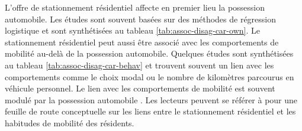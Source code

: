         L'offre de stationnement résidentiel affecte en premier lieu la possession automobile. Les études sont souvent basées sur des méthodes de régression logistique et sont synthétisées au tableau \ref{tab:assoc-disag-car-own}. Le stationnement résidentiel peut aussi être associé avec les comportements de mobilité au-delà de la possession automobile. Quelques études sont synthétisées au tableau \ref{tab:assoc-disag-car-behav} et trouvent souvent un lien avec les comportements comme le choix modal ou le nombre de kilomètres parcourus en véhicule personnel. Le lien avec les comportements de mobilité est souvent modulé par la possession automobile \parencite{currans_households_2023,chatman_does_2013}. Les lecteurs peuvent se référer à \textcite{currans_linking_2021} pour une feuille de route conceptuelle sur les liens entre le stationnement résidentiel et les habitudes de mobilité des résidents.


